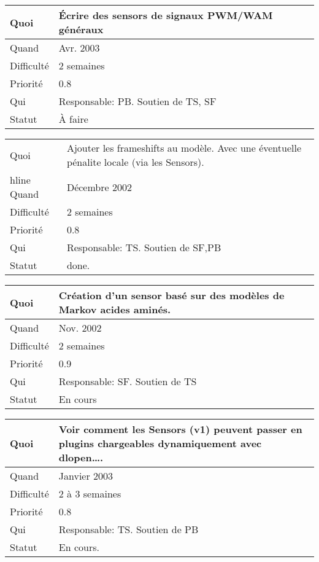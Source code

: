 \documentclass[a4paper,11pt]{article}
\begin{document}
\begin{longtable}{|l|p{7cm}|}\hline
  Quoi & \'Ecrire des sensors de signaux PWM/WAM g\'en\'eraux\\\hline
  Quand  &  Avr. 2003\\\hline
  Difficult\'e &  2 semaines\\\hline
  Priorit\'e &  0.8 \\\hline
  Qui & Responsable: PB. Soutien de TS, SF\\\hline
  Statut & \`A faire\\\hline
\end{longtable}

\begin{longtable}{|l|p{7cm}|}\hline
  Quoi & Ajouter les frameshifts au mod\`ele. Avec une \'eventuelle
  p\'enalite locale (via les Sensors). \\hline
  Quand  &  D\'ecembre 2002 \\\hline
  Difficult\'e &  2 semaines\\\hline
  Priorit\'e &  0.8\\\hline
  Qui & Responsable: TS. Soutien de SF,PB\\\hline
  Statut & done.\\\hline 
\end{longtable}

\begin{longtable}{|l|p{7cm}|}\hline
  Quoi & Cr\'eation d'un sensor bas\'e sur des mod\`eles de Markov acides amin\'es.\\\hline
  Quand  &  Nov. 2002\\\hline
  Difficult\'e &  2 semaines\\\hline
  Priorit\'e &  0.9 \\\hline
  Qui & Responsable: SF. Soutien de TS\\\hline
  Statut & En cours\\\hline
\end{longtable}
 
\begin{longtable}{|l|p{7cm}|}\hline
  Quoi & Voir comment les Sensors (v1) peuvent passer en plugins
  chargeables dynamiquement avec dlopen\ldots.\\\hline
  Quand  &  Janvier 2003\\\hline
  Difficult\'e &  2 \`a 3 semaines\\\hline
  Priorit\'e &  0.8\\\hline
  Qui & Responsable: TS. Soutien de PB \\\hline
  Statut & En cours.\\\hline
\end{longtable}
\end{document}
